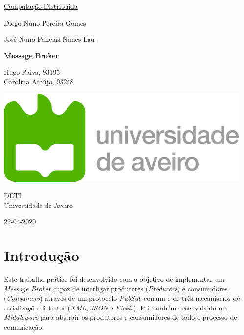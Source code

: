 \documentclass[10pt,portuguese]{article}
\begin{document}

\begin{titlepage}
	\clearpage\thispagestyle{empty}
	\centering
	\vspace{2cm}

	
	{\Large\underline{Computação Distribuída} \par}
	\vspace{0.5cm}
	{\small
	Diogo Nuno Pereira Gomes \par José Nuno Panelas Nunes Lau  \par}
	\vspace{4cm}
	{\LARGE \textbf{Message Broker}} \\
		\vspace{0.5cm}
	\vspace{1cm}
	\vspace{4cm}
	{\normalsize Hugo Paiva, 93195
	        \\Carolina Araújo, 93248
	   \par}
	\vspace{2cm}

    \includegraphics[scale=0.20]{logo_ua.png}
    
    \vspace{2cm}
    
	{\normalsize DETI \\ 
		Universidade de Aveiro \par}
		
	{\normalsize 22-04-2020 \par}
	\vspace{2cm}
		
	
	\pagebreak

\end{titlepage}
\newpage

\section{Introdução}

\par Este trabalho prático foi desenvolvido com o objetivo de implementar um \textit{Message Broker} capaz de interligar produtores (\textit{Producers}) e consumidores (\textit{Consumers}) através de um protocolo \textit{PubSub} comum e de três mecanismos de serialização distintos (\textit{XML}, \textit{JSON} e \textit{Pickle}). Foi também desenvolvido um \textit{Middleware} para abstrair os produtores e consumidores de todo o processo de comunicação.
\end{document}
